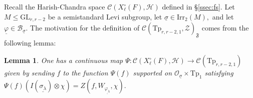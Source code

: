 \documentclass[12pt]{amsart}
\newtheorem{lem}[thm]{Lemma}
\theoremstyle{remark}
\numberwithin{equation}{section}
\newcommand{\GL}{\mathrm{GL}}
\newcommand{\OO}{\mathcal{O}}
\theoremstyle{definition}
\numberwithin{equation}{subsection}
\begin{document}
Recall the Harish-Chandra space $\mathcal{C}(X^\circ_{\ell}(F),\mathcal{H})$ defined in \S \ref{ssec:fs}.  
Let $M \leq \GL_{r,r-2}$ be a semistandard Levi subgroup, let $\underline{\sigma} \in \mathrm{Irr}_2(M),$ and let $\underline{\varphi} \in \mathcal{B}_{\underline{\sigma}}.$  The motivation for the definition of $\mathcal{C}(\mathrm{Tp}_{r,r-2,1},\mathcal{Z})_{\mathfrak{F}}$ comes from the following lemma:

\begin{lem} \label{lem:is:cont:for:HP2}
One has a continuous map
$
\Psi:\mathcal{C}(X^\circ_\ell(F),\mathcal{H}) \to \mathcal{C}(\mathrm{Tp}_{r,r-2,1})$
given by sending $f$ to the function $\Psi(f)$ supported on $\OO_{\underline{\sigma}} \times \mathrm{Tp}_1$ satisfying
$\Psi(f)(I(\underline{\sigma_{\lambda}}) \otimes \chi)=Z(f,W_{\underline{\varphi_\lambda}},\chi).$
\end{lem}
\end{document}
